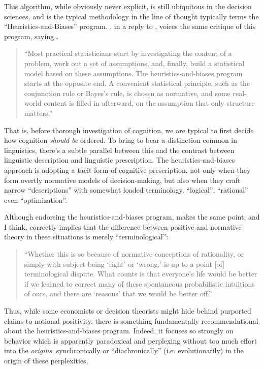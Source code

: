 \documentclass{article}
\begin{document}
This algorithm, while obviously never explicit, is still ubiquitous in the decision sciences, and is the typical methodology in the line of thought typically terms the ``Heuristics-and-Biases'' program.
\textcite{gigerenzer96}, in a reply to \textcite{kahneman96}, voices the same critique of this program, saying\ldots

\begin{quotation}
	``Most practical statisticians start by investigating the content of a problem, work out a set of assumptions, and, finally, build a statistical model based on these assumptions.
	The heuristics-and-biases program starts at the opposite end.
	A convenient statistical principle, such as the conjunction rule or Bayes's rule, is chosen as normative, and some real-world content is filled in afterward, on the assumption that only structure matters.''
\end{quotation}

That is, before thorough investigation of cognition, we are typical to first decide how cognition \emph{should be} ordered.
To bring to bear a distinction common in linguistics, there's a subtle parallel between this and the contrast between linguistic description and linguistic prescription.
The heuristics-and-biases approach is adopting a tacit form of cognitive prescription, not only when they form overtly normative models of decision-making, but also when they craft narrow ``descriptions'' with somewhat loaded terminology, ``logical'', ``rational'' even ``optimization''.

Although endorsing the heuristics-and-biases program, \textcite[194]{massimo96} makes the same point, and I think, correctly implies that the difference between positive and normative theory in these situations is merely ``terminological'':

\begin{quotation}
	``Whether this is so because of normative conceptions of rationality, or simply with subject being `right' or `wrong,' is up to a point [of] terminological dispute. What counts is that everyone's life would be better if we learned to correct many of these spontaneous probabilistic intuitions of ours, and there are `reasons' that we would be better off.''
\end{quotation}

Thus, while some economists or decision theorists might hide behind purported claims to notional positivity, there is something fundamentally recommendational about the heuristics-and-biases program.
Indeed, it focuses so strongly on behavior which is apparently paradoxical and perplexing without too much effort into the \emph{origins}, synchronically or ``diachronically'' (i.e. evolutionarily) in the origin of these perplexities.
\end{document}
